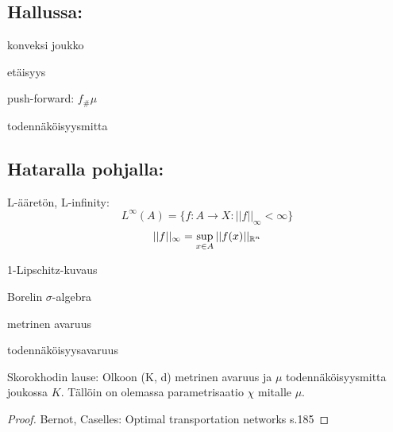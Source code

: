 


\subsection{Hallussa:}
\begin{definition}
    konveksi joukko
\end{definition}
\begin{definition}
    etäisyys
\end{definition}
\begin{definition}
    push-forward: $f_\#\mu$
\end{definition}

\begin{definition}
    todennäköisyysmitta
\end{definition}

\subsection{Hataralla pohjalla:}
\begin{definition}
L-ääretön, L-infinity:
    \[L^\infty (A) = \{f:A\to X: ||f||_\infty < \infty\}\] 
    \[||f||_\infty = \sup_{x\in A} ||f(x)||_{\mathbb{R}^n}\]
\end{definition}
\begin{definition}
    1-Lipschitz-kuvaus
\end{definition}


\begin{definition}
    Borelin $\sigma$-algebra
\end{definition}

\begin{definition}
    metrinen avaruus
\end{definition}

\begin{definition}
    todennäköisyysavaruus
\end{definition}

\begin{theorem}
    Skorokhodin lause: Olkoon (K, d)  metrinen avaruus ja $\mu$ todennäköisyysmitta joukossa $K$. Tällöin on olemassa parametrisaatio $\chi$ mitalle $\mu$.
\end{theorem}
\begin{proof}
Bernot, Caselles: Optimal transportation networks s.185
\end{proof}

